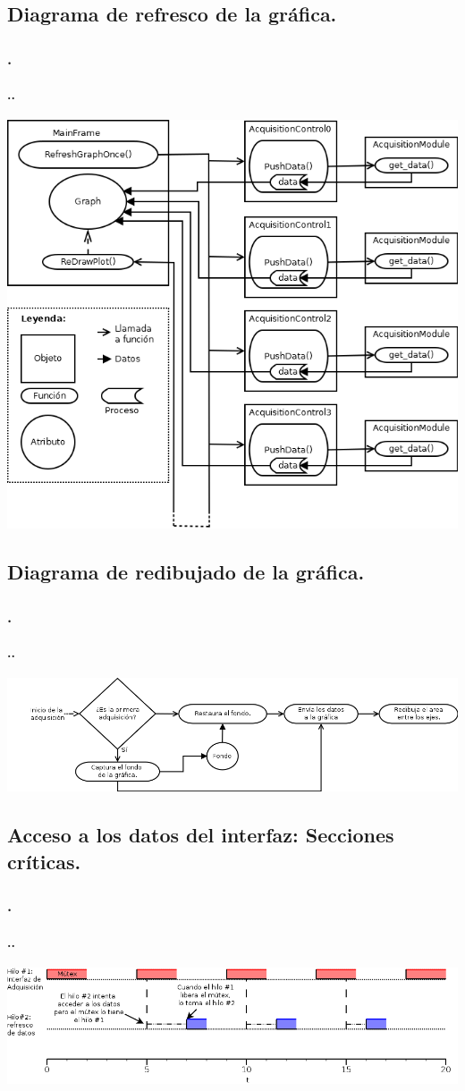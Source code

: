 \documentclass{beamer}
\newenvironment{slide}	%
{\begin{frame}[environment=slide]
\frametitle{\insertsectionnumber.\insertsection}
\framesubtitle{\setlength{\parindent}{2ex} \insertsectionnumber.\insertsubsectionnumber.\insertsubsection}}
{\end{frame}}
\begin{document}
\subsection{Diagrama de refresco de la gráfica.}
\begin{slide}
	\centering
	\includegraphics[scale=0.35]{graph-refresh_diagram.png}
\end{slide}

\subsection{Diagrama de redibujado de la gráfica.}
\begin{slide}
	\centering
	\includegraphics[width=1\textwidth]{graph_redraw-diagram.png}
\end{slide}

\subsection{Acceso a los datos del interfaz: Secciones críticas.}
\begin{slide}
	\centering
	\includegraphics[width=1\textwidth]{diag-sincronia.png}
\end{slide}
\end{document}
